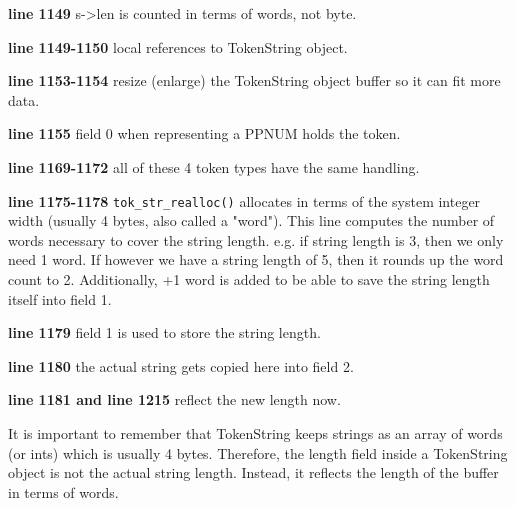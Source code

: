 \begin{tcc_desc}
        \textbf{line 1149} s->len is counted in terms of words, not byte.

        \textbf{line 1149-1150} local references to TokenString object.

        \textbf{line 1153-1154} resize (enlarge) the TokenString object buffer so it can fit more data.

        \textbf{line 1155} field 0 when representing a PPNUM holds the token.

        \textbf{line 1169-1172} all of these 4 token types have the same handling.

        \textbf{line 1175-1178} \verb|tok_str_realloc()| allocates in terms of the system integer width (usually 4 bytes, also called a "word"). This line computes the number of words necessary to cover the string length. e.g. if string length is 3, then we only need 1 word. If however we have a string length of 5, then it rounds up the word count to 2. Additionally, +1 word is added to be able to save the string length itself into field 1.

        \textbf{line 1179} field 1 is used to store the string length.

        \textbf{line 1180} the actual string gets copied here into field 2.

        \textbf{line 1181 and line 1215} reflect the new length now.
\end{tcc_desc}

It is important to remember that TokenString keeps strings as an array of words (or ints) which is usually 4 bytes. Therefore, the length field inside a TokenString object is not the actual string length. Instead, it reflects the length of the buffer in terms of words.

